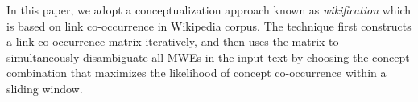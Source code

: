 
In this paper, we adopt a conceptualization approach known as {\em wikification}
\cite{Zhiyuan2013} which is based on
link co-occurrence in Wikipedia corpus. The technique first constructs a link
co-occurrence matrix iteratively, and then uses the matrix to simultaneously
disambiguate all MWEs in the input text by choosing the concept
combination that maximizes the likelihood of concept co-occurrence within
a sliding window.
%
%
